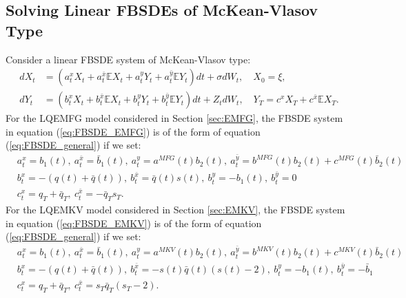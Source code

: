 \documentclass[11pt]{article}
\begin{document}
\begin{appendices}

\section{\textbf{Solving Linear FBSDEs of McKean-Vlasov Type}} \label{appendix_solving_fbsdes}

Consider a linear FBSDE system of McKean-Vlasov type:
\begin{equation}
\begin{split}
        dX_t&=\left(a^x_tX_t+a^{\bar{x}}_t \mathbb{E}X_t+a^y_tY_t+a^{\bar{y}}_t \mathbb{E}Y_t\right)dt+\sigma dW_t, \quad X_0=\xi, \\
        dY_t&=\left(b^x_tX_t+b^{\bar{x}}_t \mathbb{E}X_t+b^y_tY_t+b^{\bar{y}}_t \mathbb{E}Y_t\right)dt +Z_t dW_t, \quad Y_T=c^xX_T+c^{\bar{x}}\mathbb{E}X_T.
\end{split}
\label{eq:FBSDE_general}
\end{equation}
For the LQEMFG model considered in Section \ref{sec:EMFG}, the FBSDE system in equation (\ref{eq:FBSDE_EMFG}) is of the form of equation (\ref{eq:FBSDE_general}) if we set:
\begin{equation*}
\begin{split}
    &a^x_t=b_1(t),\ a^{\bar{x}}_t=\bar{b}_1(t),\ a^y_t=a^{MFG}(t)b_2(t),\ a^{\bar{y}}_t=b^{MFG}(t)b_2(t)+c^{MFG}(t)\bar{b}_2(t) \\
    &b^x_t=-(q(t)+\bar{q}(t)),\ b^{\bar{x}}_t=\bar{q}(t)s(t),\ b^y_t=-b_1(t),\ b^{\bar{y}}_t=0 \\
    &c^x_t=q_T+\bar{q}_T,\ c^{\bar{x}}_t=-\bar{q}_Ts_T.
\end{split}
\end{equation*}
For the LQEMKV model considered in Section \ref{sec:EMKV}, the FBSDE system in equation (\ref{eq:FBSDE_EMKV}) is of the form of equation (\ref{eq:FBSDE_general}) if we set:
\begin{equation*}
\begin{split}
    &a^x_t=b_1(t),\ a^{\bar{x}}_t=\bar{b}_1(t),\ a^y_t=a^{MKV}(t)b_2(t),\ a^{\bar{y}}_t=b^{MKV}(t)b_2(t)+c^{MKV}(t)\bar{b}_2(t) \\
    &b^x_t=-(q(t)+\bar{q}(t)),\ b^{\bar{x}}_t=-s(t)\bar{q}(t)(s(t)-2),\ b^y_t=-b_1(t),\ b^{\bar{y}}_t=-\bar{b}_1 \\
    &c^x_t=q_T+\bar{q}_T,\ c^{\bar{x}}_t=s_T\bar{q}_T(s_T-2).
\end{split}
\end{equation*}


\end{appendices}
\end{document}
